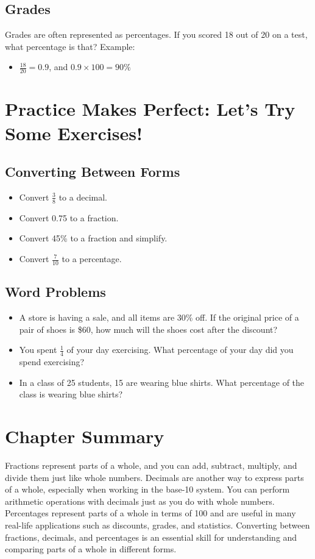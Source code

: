 \subsection{Grades}
Grades are often represented as percentages. If you scored 18 out of 20 on a test, what percentage is that? Example:
\begin{itemize}
    \item $\frac{18}{20} = 0.9$, and $0.9 \times 100 = 90\%$
\end{itemize}

\section{Practice Makes Perfect: Let’s Try Some Exercises!}
\subsection{Converting Between Forms}
\begin{itemize}
    \item Convert $\frac{3}{8}$ to a decimal.
    \item Convert 0.75 to a fraction.
    \item Convert 45\% to a fraction and simplify.
    \item Convert $\frac{7}{10}$ to a percentage.
\end{itemize}

\subsection{Word Problems}
\begin{itemize}
    \item A store is having a sale, and all items are 30\% off. If the original price of a pair of shoes is \$60, how much will the shoes cost after the discount?
    \item You spent $\frac{1}{4}$ of your day exercising. What percentage of your day did you spend exercising?
    \item In a class of 25 students, 15 are wearing blue shirts. What percentage of the class is wearing blue shirts?
\end{itemize}

\section{Chapter Summary}
Fractions represent parts of a whole, and you can add, subtract, multiply, and divide them just like whole numbers.
Decimals are another way to express parts of a whole, especially when working in the base-10 system. You can perform arithmetic operations with decimals just as you do with whole numbers.
Percentages represent parts of a whole in terms of 100 and are useful in many real-life applications such as discounts, grades, and statistics.
Converting between fractions, decimals, and percentages is an essential skill for understanding and comparing parts of a whole in different forms.

